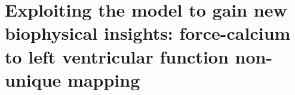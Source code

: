 \chapter{Exploiting the model to gain new biophysical insights: force-calcium 
to left ventricular function non-unique mapping}\label{cha:chapter8}
%
%
%